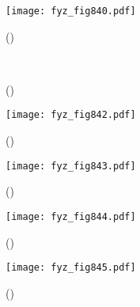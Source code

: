    \begin{figure}[ht!] %
      \centering
      \texttt{[image: fyz\_fig840.pdf]}
      \caption{
               (\cite[s.~707]{Feynman02})}
      \label{fyz:fig840}
    \end{figure}
    
    \begin{figure}[ht!] %
      \centering
                     \\
      \caption{
               (\cite[s.~748]{Feynman02})}
      \label{fyz:fig841}
    \end{figure}

    \begin{figure}[ht!] %
      \centering
      \texttt{[image: fyz\_fig842.pdf]}
      \caption{
               (\cite[s.~707]{Feynman02})}
      \label{fyz:fig842}
    \end{figure}

    \begin{figure}[ht!] %
      \centering
      \texttt{[image: fyz\_fig843.pdf]}
      \caption{
               (\cite[s.~707]{Feynman02})}
      \label{fyz:fig843}
    \end{figure}

    \begin{figure}[ht!] %
      \centering
      \texttt{[image: fyz\_fig844.pdf]}
      \caption{
               (\cite[s.~707]{Feynman02})}
      \label{fyz:fig844}
    \end{figure}

    \begin{figure}[ht!] %
      \centering
      \texttt{[image: fyz\_fig845.pdf]}
      \caption{
               (\cite[s.~707]{Feynman02})}
      \label{fyz:fig845}
    \end{figure}

